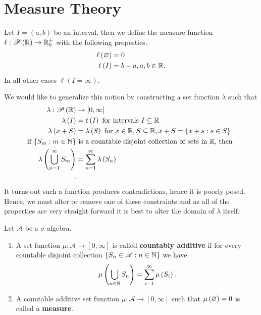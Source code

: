 \section{Measure Theory}
\begin{definition}[Length]
	Let \(I = \left( a, b \right) \) be an interval, then we define the measure function \(\ell: \mathscr{P}\left( \mathbb{R} \right)  \to \mathbb{R}^{+}_{0}\) with the following properties:
	\begin{align*}
		\ell \left( \varnothing \right) &= 0\\
		\ell \left(  I  \right) &= b - a, a, b \in \mathbb{R}
	.\end{align*}
	In all other cases \(\ell \left( I = \infty \right) \).\\
\end{definition}
We would like to generalize this notion by constructing a set function \(\lambda\) such that
\begin{align*}
	\lambda:  \mathscr{P} \left( \mathbb{R} \right) &\to \left[ 0, \infty \right] \\
	\lambda\left( I \right) &= \ell\left( I \right) \text{ for intervals \(I \subseteq \ensuremath{\mathbb{R}}\)} \\
	\lambda\left( x + S \right) &=  \lambda\left( S \right) \text{ for \(x \in \ensuremath{\mathbb{R}}, S \subseteq \ensuremath{\mathbb{R}}, x + S = \{x + s : s \in S\} \)} \\
	\text{if } \{S_{m} : m \in \mathbb{N}\} &\text{ is a countable disjoint collection of sets in \(\ensuremath{\mathbb{R}}\), then }\\ \lambda\left( \bigcup_{n=1} ^{\infty} S_{m} \right) &=  \sum_{n=1}^{\infty} \lambda\left( S_{n} \right)  \\
.\end{align*}
It turns out such a function produces contradictions, hence it is poorly posed. Hence, we must alter or remove one of these constraints and as all of the properties are very straight forward it is best to alter the domain of \(\lambda\) itself.
\begin{definition}[Measure]
	Let \(\mathscr{A}\) be a \(\sigma\)-algebra.\\
	\begin{enumerate}
		\item A set function \(\mu: \mathscr{A}\to \left[ 0, \infty \right] \) is called \textbf{countably additive} if for every countable disjoint collection \(\{S_{n} \in \mathscr{A} : n \in \mathbb{N}\} \) we have \[
				\mu \left( \bigcup_{n \in \mathbb{N}} S_{n} \right)  = \sum_{i= 1}^{\infty} \mu \left( S_{i} \right)
		.\]
	\item A countable additive set function \(\mu: \mathscr{A} \to \left[ 0, \infty \right] \) such that \(\mu \left( \varnothing \right) = 0\) is called a \textbf{measure}.
	\end{enumerate}
\end{definition}
